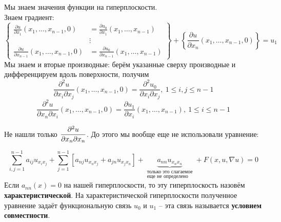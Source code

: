 \documentclass[../main.tex]{subfiles}
\begin{document}
Мы знаем значения функции на гиперплоскости.\\
Знаем градиент:
\begin{equation*}
\left\{\begin{aligned}
\frac{\partial u}{\partial x_1}(x_1, \dots, x_{n-1}, 0) &= \frac{\partial u_0}{\partial x_1}(x_1, \dots, x_{n-1})\\ 
&\vdots \\
\frac{\partial u}{\partial x_{n-1}}(x_1, \dots, x_{n-1}, 0) &= \frac{\partial u_0}{\partial x_{n-1}}(x_1, \dots, x_{n-1})
\end{aligned} \right\}
+\left\{\frac{\partial u}{\partial x_n}(x_1,\dots,x_{n-1},0)\right\} = u_1
\end{equation*}
Мы знаем и вторые производные: берём указанные сверху производные и дифференцируем вдоль поверхности, получим \[\frac{\partial^2u}{\partial x_i\partial x_j}(x_1,\dots,x_{n-1}, 0) = \frac{\partial^2u_0}{\partial x_i\partial x_j},\ 1\le i,j \le n-1 \]
\[\frac{\partial^2u}{\partial x_n\partial x_i}(x_1,\dots,x_{n-1}, 0) = \frac{\partial u_1}{\partial x_i}(x_1,\dots,x_{n-1}),\ 1\le i\le n-1\]

Не нашли только $\dfrac{\partial^2 u}{\partial x_n\partial x_n}$. До этого мы вообще еще не использовали уравнение:

$$\sum\limits_{i,j=1}^{n-1}a_{ij}u_{x_ix_j} + \sum\limits_{j=1}^{n-1}\left[a_{nj}u_{x_nx_j} + a_{jn}u_{x_jx_n}\right] + \underbrace{a_{nn}u_{x_nx_n}}_{\substack{\text{только это слагаемое}\\ \text{еще не определено}}} + F(x, u, \nabla u) = 0 $$
Если $a_{nn}(x) = 0$ на нашей гиперплоскости, то эту гиперплоскость назовём {\bf характеристической}. На характеристической гиперплоскости полученное уравнение задаёт функциональную связь $u_0$ и $u_1$ -- эта связь называется {\bf условием совместности}.
\end{document}
